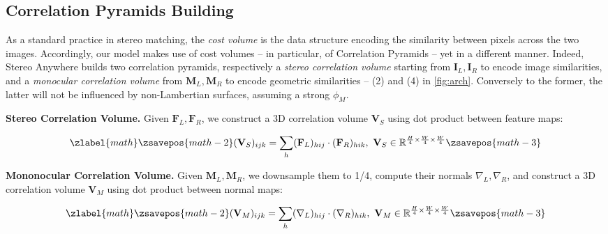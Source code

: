 \documentclass[10pt,twocolumn,letterpaper]{article}
\newcommand{\method}[0]{Stereo Anywhere\xspace}
\begin{document}
\phantom{Invisible Text}
\vspace{-\baselineskip}

\subsection{Correlation Pyramids Building}

\label{subsec:corr_pyramids}

As a standard practice in stereo matching, the \textit{cost volume} is the data structure encoding the similarity between pixels across the two images. Accordingly, our model makes use of cost volumes -- in particular, of Correlation Pyramids \cite{lipson2021raft} -- yet in a different manner.
Indeed, \method builds two correlation pyramids, respectively a \textit{stereo correlation volume} starting from $\mathbf{I}_L, \mathbf{I}_R$ to encode image similarities, and a \textit{monocular correlation volume} from $\mathbf{M}_L, \mathbf{M}_R$ to encode geometric similarities -- (2) and (4) in \cref{fig:arch}.
Conversely to the former, the latter will not be influenced by non-Lambertian surfaces, assuming a strong $\phi_M$.

\textbf{Stereo Correlation Volume.} Given $\mathbf{F}_L, \mathbf{F}_R$, we construct a 3D correlation volume $\mathbf{V}_S$ using dot product between feature maps:


\begin{equation}
\zlabel{math}
    \zsavepos{math-2}
    (\mathbf{V}_S)_{ijk} = \sum_{h} (\mathbf{F}_L)_{hij} \cdot (\mathbf{F}_R)_{hik}, \ \mathbf{V}_S \in \mathbb{R}^{\frac{H}{4} \times \frac{W}{4} \times \frac{W}{4}}
    \label{eq:dot_corr}
    \zsavepos{math-3}\end{equation}



\textbf{Mononocular Correlation Volume.} Given $\mathbf{M}_L, \mathbf{M}_R$,
we downsample them to 1/4, compute their normals $\nabla_L, \nabla_R$,
and construct a 3D correlation volume $\mathbf{V}_M$ using dot product between normal maps:


\begin{equation}
\zlabel{math}
    \zsavepos{math-2}
    (\mathbf{V}_M)_{ijk} = \sum_{h} (\nabla_L)_{hij} \cdot (\nabla_R)_{hik}, \ \mathbf{V}_M \in \mathbb{R}^{\frac{H}{4} \times \frac{W}{4} \times \frac{W}{4}}
    \label{eq:dot_corr_mono}
    \zsavepos{math-3}\end{equation}
\end{document}

